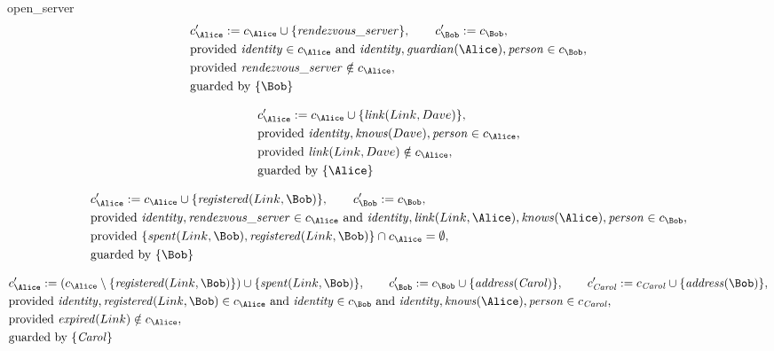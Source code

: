 open_server
\fi
\begin{align*}
&
c'_
{
\Alice
}
 := 
c_
{
\Alice
}
 \cup 
\{
\mathit{\detokenize{
rendezvous_server
}}
\}
, \qquad 
c'_
{
\Bob
}
 := 
c_
{
\Bob
}
,\\
&
\text{provided } 
\mathit{\detokenize{
identity
}}
 \in c_
{
\Alice
}
 \text{ and } 
\mathit{\detokenize{
identity
}}
,
\mathit{\detokenize{
guardian
}}
(
\Alice
)
,
\mathit{\detokenize{
person
}}
 \in c_
{
\Bob
}
,\\
&
\text{provided } 
\mathit{\detokenize{
rendezvous_server
}}
 \notin c_
{
\Alice
}
,\\
&
\text{guarded by } \{
\Bob
\}
\end{align*}

\begin{align*}
&
c'_
{
\Alice
}
 := 
c_
{
\Alice
}
 \cup 
\{
\mathit{\detokenize{
link
}}
(
Link
,
Dave
)
\}
,\\
&
\text{provided } 
\mathit{\detokenize{
identity
}}
,
\mathit{\detokenize{
knows
}}
(
Dave
)
,
\mathit{\detokenize{
person
}}
 \in c_
{
\Alice
}
,\\
&
\text{provided } 
\mathit{\detokenize{
link
}}
(
Link
,
Dave
)
 \notin c_
{
\Alice
}
,\\
&
\text{guarded by } \{
\Alice
\}
\end{align*}

\begin{align*}
&
c'_
{
\Alice
}
 := 
c_
{
\Alice
}
 \cup 
\{
\mathit{\detokenize{
registered
}}
(
Link
,
\Bob
)
\}
, \qquad 
c'_
{
\Bob
}
 := 
c_
{
\Bob
}
,\\
&
\text{provided } 
\mathit{\detokenize{
identity
}}
,
\mathit{\detokenize{
rendezvous_server
}}
 \in c_
{
\Alice
}
 \text{ and } 
\mathit{\detokenize{
identity
}}
,
\mathit{\detokenize{
link
}}
(
Link
,
\Alice
)
,
\mathit{\detokenize{
knows
}}
(
\Alice
)
,
\mathit{\detokenize{
person
}}
 \in c_
{
\Bob
}
,\\
&
\text{provided } 
\{
\mathit{\detokenize{
spent
}}
(
Link
,
\Bob
)
,
\mathit{\detokenize{
registered
}}
(
Link
,
\Bob
)
\}
 \cap c_
{
\Alice
}
 = \emptyset
,\\
&
\text{guarded by } \{
\Bob
\}
\end{align*}

\begin{align*}
&
c'_
{
\Alice
}
 := 
(c_
{
\Alice
}
 \setminus 
\{
\mathit{\detokenize{
registered
}}
(
Link
,
\Bob
)
\}
) \cup 
\{
\mathit{\detokenize{
spent
}}
(
Link
,
\Bob
)
\}
, \qquad 
c'_
{
\Bob
}
 := 
c_
{
\Bob
}
 \cup 
\{
\mathit{\detokenize{
address
}}
(
\mathit{Carol}
)
\}
, \qquad 
c'_
{
\mathit{Carol}
}
 := 
c_
{
\mathit{Carol}
}
 \cup 
\{
\mathit{\detokenize{
address
}}
(
\Bob
)
\}
,\\
&
\text{provided } 
\mathit{\detokenize{
identity
}}
,
\mathit{\detokenize{
registered
}}
(
Link
,
\Bob
)
 \in c_
{
\Alice
}
 \text{ and } 
\mathit{\detokenize{
identity
}}
 \in c_
{
\Bob
}
 \text{ and } 
\mathit{\detokenize{
identity
}}
,
\mathit{\detokenize{
knows
}}
(
\Alice
)
,
\mathit{\detokenize{
person
}}
 \in c_
{
\mathit{Carol}
}
,\\
&
\text{provided } 
\mathit{\detokenize{
expired
}}
(
Link
)
 \notin c_
{
\Alice
}
,\\
&
\text{guarded by } \{
\mathit{Carol}
\}
\end{align*}
